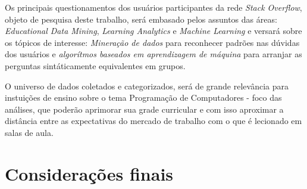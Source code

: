 \documentclass[
	12pt,				%
	openright,		%
	twoside,			%
	a4paper,			%
	english,				%
	french,				%
	spanish,			%
	brazil,				%
	]{abntex2}
\begin{document}

 Os principais questionamentos dos usuários participantes da rede \textit{Stack Overflow}, objeto de pesquisa deste trabalho, será embasado pelos assuntos das áreas: \textsf{\textit{Educational Data Mining}}, \textsf{\textit{Learning Analytics}} e \textsf{\textit{Machine Learning}} e versará sobre os tópicos de interesse: \emph{Mineração de dados} para reconhecer padrões nas dúvidas dos usuários e \emph{algorítmos baseados em aprendizagem de máquina} para arranjar as perguntas sintáticamente equivalentes em grupos. 

O universo de dados coletados e categorizados, será de grande relevância  para instuições de ensino sobre o tema Programação de Computadores - foco das análises, que poderão aprimorar sua grade curricular e com isso aproximar a distância entre as expectativas do mercado de trabalho com o que é lecionado em salas de aula.







\chapter*[Considerações finais]{Considerações finais}

\lipsum[31-33]

\postextual



%
%



\printindex
\end{document}
